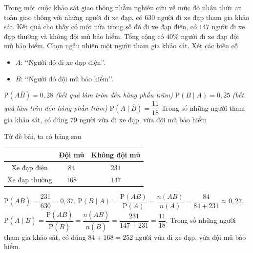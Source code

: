 \begin{ex}%
	Trong một cuộc khảo sát giao thông nhằm nghiên cứu về mức độ nhận thức an toàn giao thông với những người đi xe đạp, có $630$ người đi xe đạp tham gia khảo sát. Kết quả cho thấy có một nửa trong số đó đi xe đạp điện, có $147$ người đi xe đạp thường và không đội mũ bảo hiểm. Tổng cộng có $40\%$ người đi xe đạp đội mũ bảo hiểm. Chọn ngẫu nhiên một người tham gia khảo sát. Xét các biến cố
	\begin{itemize}
		\item $A$: \lq\lq Người đó đi xe đạp điện\rq\rq.
		\item $B$: \lq\lq Người đó đội mũ bảo hiểm\rq\rq.
	\end{itemize}
	\choiceTF
	{$\mathrm{P}\left(A\overline{B}\right)= 0{,}28$ \textit{(kết quả làm tròn đến hàng phần trăm)}}
	{$\mathrm{P}(B\mid A)=0{,}25$ \textit{(kết quả làm tròn đến hàng phần trăm)}}
	{\True $\mathrm{P}\left(A\mid\overline{B}\right)=\dfrac{11}{18}$}
	{Trong số những người tham gia khảo sát, có đúng $79$ người vừa đi xe đạp, vừa đội mũ bảo hiểm}
	\loigiai
	{
		Từ đề bài, ta có bảng sau
		\begin{center}
			\begin{tabular}{|c|c|c|}
				\hline
				& Đội mũ & Không đội mũ \\
				\hline
				Xe đạp điện & $84$ & $231$ \\
				\hline
				Xe đạp thường & $168$ & $147$ \\
				\hline
			\end{tabular}
		\end{center}
		\begin{itemchoice}
			\itemch $\mathrm{P}\left(A\overline{B}\right)=\dfrac{231}{630}=0{,}37$.
			\itemch $\mathrm{P}(B\mid A)=\dfrac{\mathrm{P}(AB)}{\mathrm{P}(A)}=\dfrac{n(AB)}{n(A)}=\dfrac{84}{84+231}\approx0{,}27$.
			\itemch $\mathrm{P}\left(A\mid\overline{B}\right)=\dfrac{\mathrm{P}\left(A\overline{B}\right)}{\mathrm{P}\left(\overline{B}\right)}=\dfrac{n\left(A\overline{B}\right)}{n\left(\overline{B}\right)}=\dfrac{231}{147+231}=\dfrac{11}{18}$.
			\itemch Trong số những người tham gia khảo sát, có đúng $84+168=252$ người vừa đi xe đạp, vừa đội mũ bảo hiểm.
		\end{itemchoice}
	}
\end{ex}

